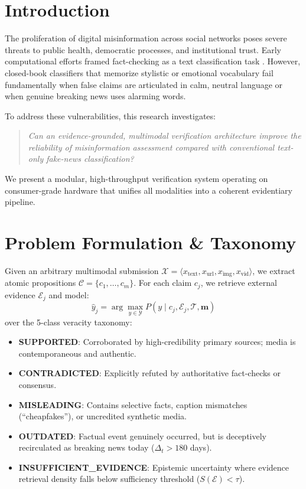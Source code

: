 \documentclass[conference]{IEEEtran}
\begin{document}
\section{Introduction}
The proliferation of digital misinformation across social networks poses severe threats to public health, democratic processes, and institutional trust. Early computational efforts framed fact-checking as a text classification task \cite{wang2017liar}. However, closed-book classifiers that memorize stylistic or emotional vocabulary fail fundamentally when false claims are articulated in calm, neutral language or when genuine breaking news uses alarming words.

To address these vulnerabilities, this research investigates:
\begin{quote}
\textit{Can an evidence-grounded, multimodal verification architecture improve the reliability of misinformation assessment compared with conventional text-only fake-news classification?}
\end{quote}

We present a modular, high-throughput verification system operating on consumer-grade hardware that unifies all modalities into a coherent evidentiary pipeline.

\section{Problem Formulation \& Taxonomy}
Given an arbitrary multimodal submission $\mathcal{X} = \langle x_{\text{text}}, x_{\text{url}}, x_{\text{img}}, x_{\text{vid}} \rangle$, we extract atomic propositions $\mathcal{C} = \{c_1, \dots, c_m\}$. For each claim $c_j$, we retrieve external evidence $\mathcal{E}_j$ and model:
\begin{equation}
\hat{y}_j = \arg\max_{y \in \mathcal{Y}} P(y \mid c_j, \mathcal{E}_j, \mathcal{T}, \mathbf{m})
\end{equation}
over the 5-class veracity taxonomy:
\begin{itemize}
    \item \textbf{SUPPORTED}: Corroborated by high-credibility primary sources; media is contemporaneous and authentic.
    \item \textbf{CONTRADICTED}: Explicitly refuted by authoritative fact-checks or consensus.
    \item \textbf{MISLEADING}: Contains selective facts, caption mismatches (``cheapfakes''), or uncredited synthetic media.
    \item \textbf{OUTDATED}: Factual event genuinely occurred, but is deceptively recirculated as breaking news today ($\Delta_t > 180$ days).
    \item \textbf{INSUFFICIENT\_EVIDENCE}: Epistemic uncertainty where evidence retrieval density falls below sufficiency threshold ($S(\mathcal{E}) < \tau$).
\end{itemize}
\end{document}
